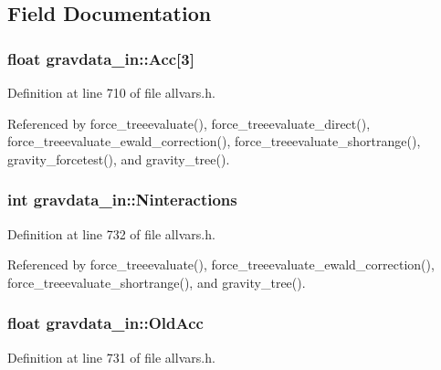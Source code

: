 \subsection{Field Documentation}
\hypertarget{structgravdata__in_a6850a5b240d113f9c28c27762d3c44ff}{
\subsubsection[{Acc}]{\setlength{\rightskip}{0pt plus 5cm}float {\bf gravdata\_\-in::Acc}\mbox{[}3\mbox{]}}}
\label{structgravdata__in_a6850a5b240d113f9c28c27762d3c44ff}


Definition at line 710 of file allvars.h.



Referenced by force\_\-treeevaluate(), force\_\-treeevaluate\_\-direct(), force\_\-treeevaluate\_\-ewald\_\-correction(), force\_\-treeevaluate\_\-shortrange(), gravity\_\-forcetest(), and gravity\_\-tree().

\hypertarget{structgravdata__in_a6b47f6ca387f17b375c949bbc9c0572f}{
\subsubsection[{Ninteractions}]{\setlength{\rightskip}{0pt plus 5cm}int {\bf gravdata\_\-in::Ninteractions}}}
\label{structgravdata__in_a6b47f6ca387f17b375c949bbc9c0572f}


Definition at line 732 of file allvars.h.



Referenced by force\_\-treeevaluate(), force\_\-treeevaluate\_\-ewald\_\-correction(), force\_\-treeevaluate\_\-shortrange(), and gravity\_\-tree().

\hypertarget{structgravdata__in_aba8345d83e2a1512a83563dbd87c9a3f}{
\subsubsection[{OldAcc}]{\setlength{\rightskip}{0pt plus 5cm}float {\bf gravdata\_\-in::OldAcc}}}
\label{structgravdata__in_aba8345d83e2a1512a83563dbd87c9a3f}


Definition at line 731 of file allvars.h.



